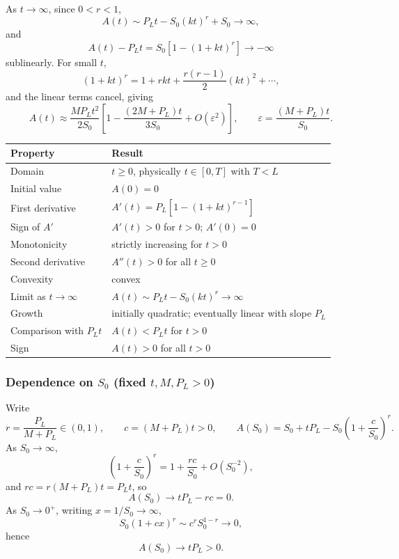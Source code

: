 \documentclass[11pt,a4paper]{article}
\begin{document}
As $t\to\infty$, since $0<r<1$,
\begin{equation}
A(t)\sim P_Lt-S_0(kt)^r+S_0\to\infty,
\end{equation}
and
\begin{equation}
A(t)-P_Lt=S_0\left[1-(1+kt)^r\right]\to-\infty
\end{equation}
sublinearly. For small $t$,
\begin{equation}
(1+kt)^r=1+rkt+\frac{r(r-1)}{2}(kt)^2+\cdots,
\end{equation}
and the linear terms cancel, giving
\begin{equation}
A(t)\approx\frac{MP_Lt^2}{2S_0}
\left[1-\frac{(2M+P_L)t}{3S_0}+O(\varepsilon^2)\right],
\qquad
\varepsilon=\frac{(M+P_L)t}{S_0}.
\end{equation}

\begin{center}
\small
\begin{tabularx}{\linewidth}{@{}YY@{}}
\toprule
Property & Result\\
\midrule
Domain & $t\ge0$, physically $t\in[0,T]$ with $T<L$\\
Initial value & $A(0)=0$\\
First derivative & $A'(t)=P_L[1-(1+kt)^{r-1}]$\\
Sign of $A'$ & $A'(t)>0$ for $t>0$; $A'(0)=0$\\
Monotonicity & strictly increasing for $t>0$\\
Second derivative & $A''(t)>0$ for all $t\ge0$\\
Convexity & convex\\
Limit as $t\to\infty$ & $A(t)\sim P_Lt-S_0(kt)^r\to\infty$\\
Growth & initially quadratic; eventually linear with slope $P_L$\\
Comparison with $P_Lt$ & $A(t)<P_Lt$ for $t>0$\\
Sign & $A(t)>0$ for all $t>0$\\
\bottomrule
\end{tabularx}
\end{center}

\subsubsection{Dependence on $S_0$ (fixed $t,M,P_L>0$)}
Write
\begin{equation}
r=\frac{P_L}{M+P_L}\in(0,1),
\qquad
c=(M+P_L)t>0,
\qquad
A(S_0)=S_0+tP_L-S_0\left(1+\frac{c}{S_0}\right)^r.
\end{equation}
As $S_0\to\infty$,
\begin{equation}
\left(1+\frac{c}{S_0}\right)^r=1+\frac{rc}{S_0}+O(S_0^{-2}),
\end{equation}
and $rc=r(M+P_L)t=P_Lt$, so
\begin{equation}
A(S_0)\to tP_L-rc=0.
\end{equation}
As $S_0\to0^+$, writing $x=1/S_0\to\infty$,
\begin{equation}
S_0(1+cx)^r\sim c^rS_0^{1-r}\to0,
\end{equation}
hence
\begin{equation}
A(S_0)\to tP_L>0.
\end{equation}
\end{document}
